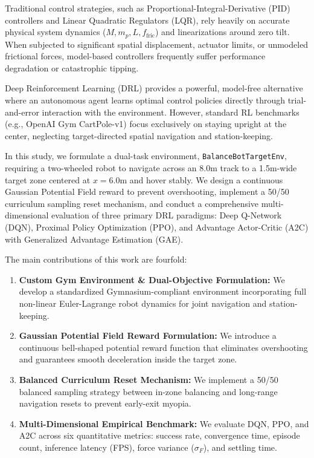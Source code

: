 \documentclass[journal,twocolumn]{IEEEtran}
\begin{document}
Traditional control strategies, such as Proportional-Integral-Derivative (PID) controllers and Linear Quadratic Regulators (LQR), rely heavily on accurate physical system dynamics ($M, m_p, L, f_{\text{fric}}$) and linearizations around zero tilt. When subjected to significant spatial displacement, actuator limits, or unmodeled frictional forces, model-based controllers frequently suffer performance degradation or catastrophic tipping.

Deep Reinforcement Learning (DRL) provides a powerful, model-free alternative where an autonomous agent learns optimal control policies directly through trial-and-error interaction with the environment. However, standard RL benchmarks (e.g., OpenAI Gym CartPole-v1) focus exclusively on staying upright at the center, neglecting target-directed spatial navigation and station-keeping.

In this study, we formulate a dual-task environment, \texttt{BalanceBotTargetEnv}, requiring a two-wheeled robot to navigate across an 8.0m track to a 1.5m-wide target zone centered at $x = 6.0\text{m}$ and hover stably. We design a continuous Gaussian Potential Field reward to prevent overshooting, implement a 50/50 curriculum sampling reset mechanism, and conduct a comprehensive multi-dimensional evaluation of three primary DRL paradigms: Deep Q-Network (DQN), Proximal Policy Optimization (PPO), and Advantage Actor-Critic (A2C) with Generalized Advantage Estimation (GAE).

The main contributions of this work are fourfold:
\begin{enumerate}
\item \textbf{Custom Gym Environment \& Dual-Objective Formulation:} We develop a standardized Gymnasium-compliant environment incorporating full non-linear Euler-Lagrange robot dynamics for joint navigation and station-keeping.
\item \textbf{Gaussian Potential Field Reward Formulation:} We introduce a continuous bell-shaped potential reward function that eliminates overshooting and guarantees smooth deceleration inside the target zone.
\item \textbf{Balanced Curriculum Reset Mechanism:} We implement a 50/50 balanced sampling strategy between in-zone balancing and long-range navigation resets to prevent early-exit myopia.
\item \textbf{Multi-Dimensional Empirical Benchmark:} We evaluate DQN, PPO, and A2C across six quantitative metrics: success rate, convergence time, episode count, inference latency (FPS), force variance ($\sigma_F$), and settling time.
\end{enumerate}
\end{document}
